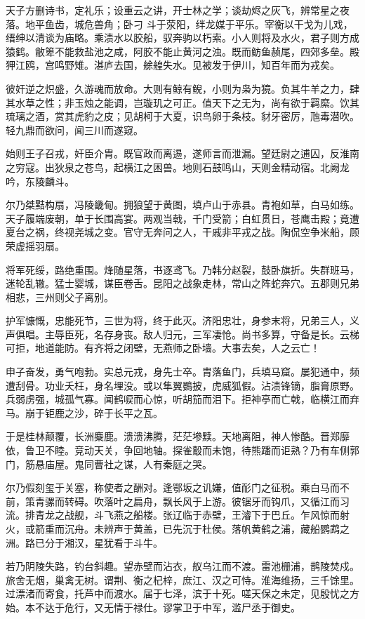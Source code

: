 天子方删诗书，定礼乐；设重云之讲，开士林之学；谈劫烬之灰飞，辨常星之夜落。地平鱼齿，城危兽角；卧刁 斗于荥阳，绊龙媒于平乐。宰衡以干戈为儿戏，缙绅以清谈为庙略。乘渍水以胶船，驭奔驹以朽索。小人则将及水火，君子则方成猿鹤。敝箄不能救盐池之咸，阿胶不能止黄河之浊。既而鲂鱼赪尾，四郊多垒。殿狎江鸥，宫鸣野雉。湛庐去国，艅艎失水。见被发于伊川，知百年而为戎矣。

彼奸逆之炽盛，久游魂而放命。大则有鲸有鲵，小则为枭为獍。负其牛羊之力，肆其水草之性；非玉烛之能调，岂璇玑之可正。值天下之无为，尚有欲于羁縻。饮其琉璃之酒，赏其虎豹之皮；见胡柯于大夏，识鸟卵于条枝。豺牙密厉，虺毒潜吹。轻九鼎而欲问，闻三川而遂窥。

始则王子召戎，奸臣介胄。既官政而离逷，遂师言而泄漏。望廷尉之逋囚，反淮南之穷寇。出狄泉之苍鸟，起横江之困兽。地则石鼓鸣山，天则金精动宿。北阙龙吟，东陵麟斗。

尔乃桀黠构扇，冯陵畿甸。拥狼望于黄图，填卢山于赤县。青袍如草，白马如练。天子履端废朝，单于长围高宴。两观当戟，千门受箭；白虹贯日，苍鹰击殿；竟遭夏台之祸，终视尧城之变。官守无奔问之人，干戚非平戎之战。陶侃空争米船，顾荣虚摇羽扇。

将军死绥，路绝重围。烽随星落，书逐鸢飞。乃韩分赵裂，鼓卧旗折。失群班马，迷轮乱辙。猛士婴城，谋臣卷舌。昆阳之战象走林，常山之阵蛇奔穴。五郡则兄弟相悲，三州则父子离别。

护军慷慨，忠能死节，三世为将，终于此灭。济阳忠壮，身参末将，兄弟三人，义声俱唱。主辱臣死，名存身丧。敌人归元，三军凄怆。尚书多算，守备是长。云梯可拒，地道能防。有齐将之闭壁，无燕师之卧墙。大事去矣，人之云亡！

申子奋发，勇气咆勃。实总元戎，身先士卒。胄落鱼门，兵填马窟。屡犯通中，频遭刮骨。功业夭枉，身名埋没。或以隼翼鷃披，虎威狐假。沾渍锋镝，脂膏原野。兵弱虏强，城孤气寡。闻鹤唳而心惊，听胡笳而泪下。拒神亭而亡戟，临横江而弃马。崩于钜鹿之沙，碎于长平之瓦。

于是桂林颠覆，长洲麋鹿。溃溃沸腾，茫茫墋黩。天地离阻，神人惨酷。晋郑靡依，鲁卫不睦。竞动天关，争回地轴。探雀鷇而未饱，待熊蹯而讵熟？乃有车侧郭门，筋悬庙屋。鬼同曹社之谋，人有秦庭之哭。

尔乃假刻玺于关塞，称使者之酬对。逢鄂坂之讥嫌，值耏门之征税。乘白马而不前，策青骡而转碍。吹落叶之扁舟，飘长风于上游。彼锯牙而钩爪，又循江而习流。排青龙之战舰，斗飞燕之船楼。张辽临于赤壁，王濬下于巴丘。乍风惊而射火，或箭重而沉舟。未辨声于黄盖，已先沉于杜侯。落帆黄鹤之浦，藏船鹦鹉之洲。路已分于湘汉，星犹看于斗牛。

若乃阴陵失路，钓台斜趣。望赤壁而沾衣，舣乌江而不渡。雷池栅浦，鹊陵焚戍。旅舍无烟，巢禽无树。谓荆、衡之杞梓，庶江、汉之可恃。淮海维扬，三千馀里。过漂渚而寄食，托芦中而渡水。届于七泽，滨于十死。嗟天保之未定，见殷忧之方始。本不达于危行，又无情于禄仕。谬掌卫于中军，滥尸丞于御史。

